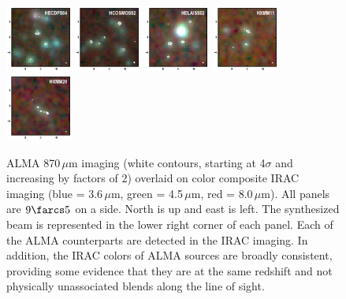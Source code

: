 \documentclass[iop]{emulateapj}
\begin{document}


\begin{figure}[!tbp] 
    \begin{centering}
\includegraphics[width=0.195\textwidth]{../Figures/HECDFS04_rgb.pdf}
\includegraphics[width=0.195\textwidth]{../Figures/HCOSMOS02_rgb.pdf}
\includegraphics[width=0.195\textwidth]{../Figures/HELAISS02_rgb.pdf}
\includegraphics[width=0.195\textwidth]{../Figures/HXMM11_rgb.pdf}
\includegraphics[width=0.195\textwidth]{../Figures/HXMM20_rgb.pdf}
\end{centering}

\caption{ ALMA 870$\,\mu$m imaging (white contours, starting at 4$\sigma$ and
increasing by factors of 2) overlaid on color composite IRAC imaging (blue =
3.6$\,\mu$m, green = 4.5$\,\mu$m, red = 8.0$\,\mu$m).  All panels are $9\farcs5$
on a side.  North is up and east is left.  The synthesized beam is represented in
the lower right corner of each panel.  Each of the ALMA counterparts are
detected in the IRAC imaging.  In addition, the IRAC colors of ALMA sources are
broadly consistent, providing some evidence that they are at the same redshift
and not physically unassociated blends along the line of
sight.}\label{fig:iraccolor}

\end{figure}
\end{document}
